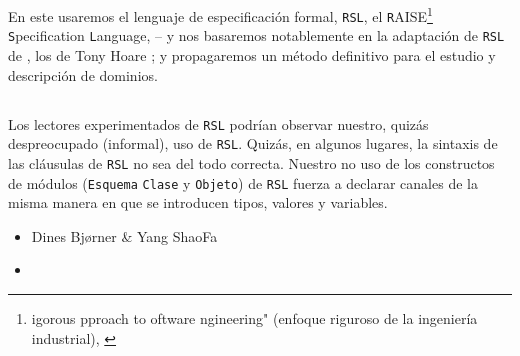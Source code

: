 \treprikker

\noindent
\pind En este \primer usaremos
\begynd 
\pind el lenguaje de especificación formal, \texttt{RSL},
\pind el \texttt{R}AISE\footnote{igorous
      pproach \ysfchgii{ }
      to  oftware ngineering" (enfoque riguroso de la ingeniería industrial), %
      \cite{RaiseMethod}} \texttt{S}pecification 
      \texttt{L}anguage, \cite{RSL} -- 
\pind y nos basaremos notablemente en la adaptación de \texttt{RSL} de , los
       de Tony Hoare \citecsp;
\pind y propagaremos un método definitivo para el estudio y
      descripción de dominios.
\afslut
\afslut

\subsection*{} 


\subsection*{}

Los lectores experimentados de \texttt{RSL} \cite{RSL} podrían observar nuestro,
quizás despreocupado (informal), uso de \texttt{RSL}. Quizás, en algunos lugares, la 
sintaxis de las cláusulas de \texttt{RSL} no sea del todo correcta. Nuestro no uso
de los constructos de módulos (\texttt{Esquema}\ysfchg{, } \texttt{Clase} y \texttt{Objeto})
de \texttt{RSL}  fuerza a declarar \textsf{canal}es de la misma manera
en que se introducen \textsf{tipo}s, \textsf{valor}es y \textsf{variable}s.

\begin{itemize}

\item[] \hfill   Dines Bj{\o}rner \& Yang ShaoFa

\item[] \hfill \todaytime
\end{itemize}


